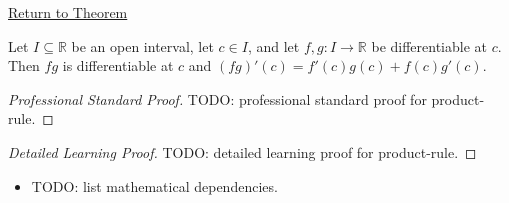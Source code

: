 \newpage
{}
\label{prf:product-rule}

\begin{remark*}[Return]
\hyperref[thm:product-rule]{Return to Theorem}
\end{remark*}

\begin{theorem*}
Let $I \subseteq \mathbb{R}$ be an open interval, let $c \in I$, and let $f, g : I \to \mathbb{R}$ be differentiable at $c$. Then $fg$ is differentiable at $c$ and $(fg)'(c) = f'(c)g(c) + f(c)g'(c)$.
\end{theorem*}

\begin{proof}[Professional Standard Proof]
\LRAProofBodyStart
TODO: professional standard proof for product-rule.
\end{proof}

\begin{proof}[Detailed Learning Proof]
\LRAProofBodyStart
TODO: detailed learning proof for product-rule.
\end{proof}

\begin{remark*}
\end{remark*}

\begin{dependencies}
\begin{itemize}
  \item TODO: list mathematical dependencies.
\end{itemize}
\end{dependencies}

\clearpage
